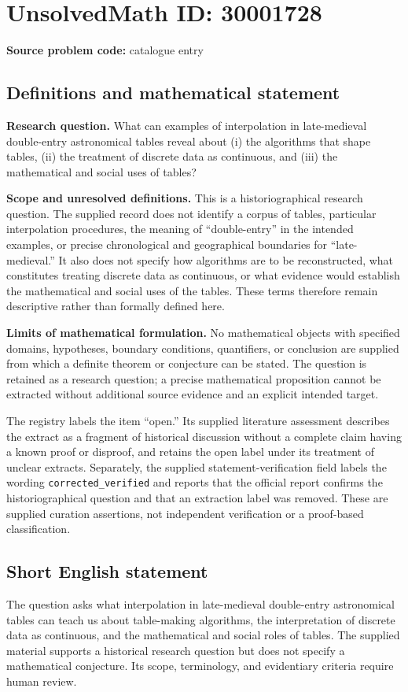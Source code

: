 \documentclass[11pt]{article}
\begin{document}
\section*{UnsolvedMath ID: 30001728}
\textbf{Source problem code:} catalogue entry
\subsection{Definitions and mathematical statement}
\textbf{Research question.} What can examples of interpolation in late-medieval double-entry astronomical tables reveal about (i) the algorithms that shape tables, (ii) the treatment of discrete data as continuous, and (iii) the mathematical and social uses of tables?

\textbf{Scope and unresolved definitions.} This is a historiographical research question. The supplied record does not identify a corpus of tables, particular interpolation procedures, the meaning of ``double-entry'' in the intended examples, or precise chronological and geographical boundaries for ``late-medieval.'' It also does not specify how algorithms are to be reconstructed, what constitutes treating discrete data as continuous, or what evidence would establish the mathematical and social uses of the tables. These terms therefore remain descriptive rather than formally defined here.

\textbf{Limits of mathematical formulation.} No mathematical objects with specified domains, hypotheses, boundary conditions, quantifiers, or conclusion are supplied from which a definite theorem or conjecture can be stated. The question is retained as a research question; a precise mathematical proposition cannot be extracted without additional source evidence and an explicit intended target.

The registry labels the item ``open.'' Its supplied literature assessment describes the extract as a fragment of historical discussion without a complete claim having a known proof or disproof, and retains the open label under its treatment of unclear extracts. Separately, the supplied statement-verification field labels the wording \texttt{corrected\_verified} and reports that the official report confirms the historiographical question and that an extraction label was removed. These are supplied curation assertions, not independent verification or a proof-based classification.
\subsection{Short English statement}
The question asks what interpolation in late-medieval double-entry astronomical tables can teach us about table-making algorithms, the interpretation of discrete data as continuous, and the mathematical and social roles of tables. The supplied material supports a historical research question but does not specify a mathematical conjecture. Its scope, terminology, and evidentiary criteria require human review.
\end{document}
